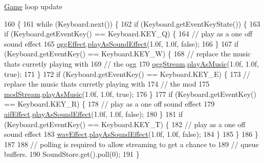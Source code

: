 \mbox{\hyperlink{interfaceorg_1_1newdawn_1_1slick_1_1_game}{Game}} loop update 
\begin{DoxyCode}
160                          \{
161         \textcolor{keywordflow}{while} (Keyboard.next()) \{
162             \textcolor{keywordflow}{if} (Keyboard.getEventKeyState()) \{
163                 \textcolor{keywordflow}{if} (Keyboard.getEventKey() == Keyboard.KEY\_Q) \{
164                     \textcolor{comment}{// play as a one off sound effect}
165                     \mbox{\hyperlink{classorg_1_1newdawn_1_1slick_1_1tests_1_1_test_utils_a4f17a6703add4a5d30e064fb32d69a34}{oggEffect}}.\mbox{\hyperlink{interfaceorg_1_1newdawn_1_1slick_1_1openal_1_1_audio_a69c3621a4a4bcbe9f1711f569c54017b}{playAsSoundEffect}}(1.0f, 1.0f, \textcolor{keyword}{false});
166                 \}
167                 \textcolor{keywordflow}{if} (Keyboard.getEventKey() == Keyboard.KEY\_W) \{
168                     \textcolor{comment}{// replace the music thats curretly playing with }
169                     \textcolor{comment}{// the ogg}
170                     \mbox{\hyperlink{classorg_1_1newdawn_1_1slick_1_1tests_1_1_test_utils_a7ea74d87f68b8c8b5e34936b51baf0b8}{oggStream}}.\mbox{\hyperlink{interfaceorg_1_1newdawn_1_1slick_1_1openal_1_1_audio_a9a13784b5ec9ce06c8756f98b00e05ab}{playAsMusic}}(1.0f, 1.0f, \textcolor{keyword}{true});
171                 \}
172                 \textcolor{keywordflow}{if} (Keyboard.getEventKey() == Keyboard.KEY\_E) \{
173                     \textcolor{comment}{// replace the music thats curretly playing with }
174                     \textcolor{comment}{// the mod}
175                     \mbox{\hyperlink{classorg_1_1newdawn_1_1slick_1_1tests_1_1_test_utils_a976c40b2829c394a1bdead2aac1125a4}{modStream}}.\mbox{\hyperlink{interfaceorg_1_1newdawn_1_1slick_1_1openal_1_1_audio_a9a13784b5ec9ce06c8756f98b00e05ab}{playAsMusic}}(1.0f, 1.0f, \textcolor{keyword}{true});
176                 \}
177                 \textcolor{keywordflow}{if} (Keyboard.getEventKey() == Keyboard.KEY\_R) \{
178                     \textcolor{comment}{// play as a one off sound effect}
179                     \mbox{\hyperlink{classorg_1_1newdawn_1_1slick_1_1tests_1_1_test_utils_af8f2ad43fbdbdc89b483f080da4ded88}{aifEffect}}.\mbox{\hyperlink{interfaceorg_1_1newdawn_1_1slick_1_1openal_1_1_audio_a69c3621a4a4bcbe9f1711f569c54017b}{playAsSoundEffect}}(1.0f, 1.0f, \textcolor{keyword}{false});
180                 \}
181                 \textcolor{keywordflow}{if} (Keyboard.getEventKey() == Keyboard.KEY\_T) \{
182                     \textcolor{comment}{// play as a one off sound effect}
183                     \mbox{\hyperlink{classorg_1_1newdawn_1_1slick_1_1tests_1_1_test_utils_a1b40069da828fdd5131e127a1db4e1f3}{wavEffect}}.\mbox{\hyperlink{interfaceorg_1_1newdawn_1_1slick_1_1openal_1_1_audio_a69c3621a4a4bcbe9f1711f569c54017b}{playAsSoundEffect}}(1.0f, 1.0f, \textcolor{keyword}{false});
184                 \}
185             \}
186         \}
187         
188         \textcolor{comment}{// polling is required to allow streaming to get a chance to}
189         \textcolor{comment}{// queue buffers.}
190         SoundStore.get().poll(0);
191     \}
\end{DoxyCode}


